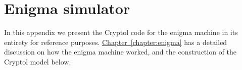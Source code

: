 \chapter{Enigma simulator}\label{app:enigma}
In this appendix we present the Cryptol code for the enigma\indEnigma
machine in its entirety for reference purposes.
\hyperref[chapter:enigma]{Chapter~\ref*{chapter:enigma}} has a
detailed discussion on how the enigma machine worked, and the
construction of the Cryptol model below.



